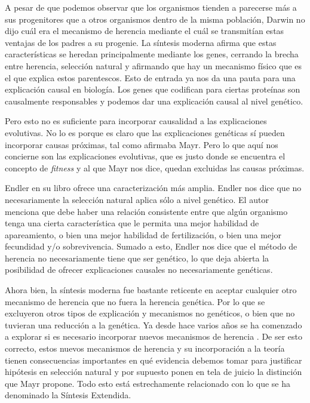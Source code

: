 A pesar de que podemos observar que los organismos tienden a parecerse más a sus progenitores que a otros organismos dentro de la misma población, Darwin no dijo cuál era el mecanismo de herencia mediante el cuál se transmitían estas ventajas de los padres a su progenie. La síntesis moderna afirma que estas características se heredan principalmente mediante los genes, cerrando la brecha entre herencia, selección natural y afirmando que hay un mecanismo físico que es el que explica estos parentescos. Esto de entrada ya nos da una pauta para una explicación causal en biología. Los genes que codifican para ciertas proteínas son causalmente responsables y podemos dar una explicación causal al nivel genético.

Pero esto no es suficiente para incorporar causalidad a las explicaciones evolutivas. No lo es porque es claro que las explicaciones genéticas sí pueden incorporar causas próximas, tal como afirmaba Mayr. Pero lo que aquí nos concierne son las explicaciones evolutivas, que es justo donde se encuentra el concepto de \emph{fitness} y al que Mayr nos dice, quedan excluidas las causas próximas.

Endler en su libro \cite{Endler1986} ofrece una caracterización más amplia. Endler nos dice que no necesariamente la selección natural aplica sólo a nivel genético. El autor menciona que debe haber una relación consistente entre que algún organismo tenga una cierta característica que le permita una mejor habilidad de apareamiento, o bien una mejor habilidad de fertilización, o bien una mejor fecundidad y/o sobrevivencia. Sumado a esto, Endler nos dice que el método de herencia no necesariamente tiene que ser genético, lo que deja abierta la posibilidad de ofrecer explicaciones causales no necesariamente genéticas.

Ahora bien, la síntesis moderna fue bastante reticente en aceptar cualquier otro mecanismo de herencia que no fuera la herencia genética. Por lo que se excluyeron otros tipos de explicación y mecanismos no genéticos, o bien que no tuvieran una reducción a la genética. Ya desde hace varios años se ha comenzado a explorar si es necesario incorporar nuevos mecanismos de herencia \cite{Jablonka2020}. De ser esto correcto, estos nuevos mecanismos de herencia y su incorporación a la teoría tienen consecuencias importantes en qué evidencia debemos tomar para justificar hipótesis en selección natural y por supuesto ponen en tela de juicio la distinción que Mayr propone. Todo esto está estrechamente relacionado con lo que se ha denominado la Síntesis Extendida.

